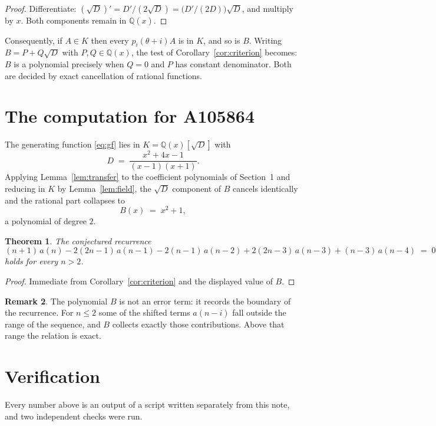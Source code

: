 \documentclass[11pt,a4paper]{article}
\theoremstyle{plain}
\newtheorem{theorem}{Theorem}
\theoremstyle{definition}
\newtheorem{remark}[theorem]{Remark}
\begin{document}
\begin{proof}
Differentiate: $(\sqrt{D})'=D'/(2\sqrt{D})=\bigl(D'/(2D)\bigr)\sqrt{D}$, and multiply by
$x$. Both components remain in $\mathbb{Q}(x)$.
\end{proof}

Consequently, if $A\in K$ then every $p_{i}(\theta+i)A$ is in $K$, and so is $B$. Writing
$B=P+Q\sqrt{D}$ with $P,Q\in\mathbb{Q}(x)$, the test of Corollary~\ref{cor:criterion}
becomes: $B$ is a polynomial precisely when $Q=0$ and $P$ has constant denominator. Both
are decided by exact cancellation of rational functions.

\section{The computation for A105864}

The generating function \eqref{eq:gf} lies in $K=\mathbb{Q}(x)[\sqrt{D}]$ with
\[
D \;=\; \frac{x^{2} + 4 x - 1}{\left(x - 1\right) \left(x + 1\right)} .
\]
Applying Lemma~\ref{lem:transfer} to the coefficient polynomials of Section~1 and reducing
in $K$ by Lemma~\ref{lem:field}, the $\sqrt{D}$ component of $B$ cancels identically and
the rational part collapses to
\[
B(x)\;=\;x^{2} + 1 ,
\]
a polynomial of degree $2$.

\begin{theorem}
The conjectured recurrence
\[
(n + 1)\,a(n) -  2 \left(2 n - 1\right)\,a(n-1) -  2 \left(n - 1\right)\,a(n-2) + 2 \left(2 n - 3\right)\,a(n-3) + (n - 3)\,a(n-4) \;=\;0
\]
holds for every $n>2$.
\end{theorem}

\begin{proof}
Immediate from Corollary~\ref{cor:criterion} and the displayed value of $B$.
\end{proof}

\begin{remark}
The polynomial $B$ is not an error term: it records the boundary of the recurrence. For
$n\le2$ some of the shifted terms $a(n-i)$ fall outside the range of the sequence,
and $B$ collects exactly those contributions. Above that range the relation is exact.
\end{remark}

\section{Verification}

Every number above is an output of a script written separately from this note, and two
independent checks were run.
\end{document}

